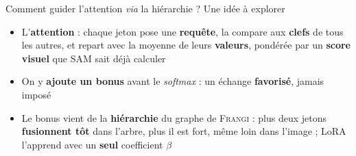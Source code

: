 \begin{frame}[t]{Comment guider l'attention \emph{via} la hiérarchie ? Une idée à explorer}
    \vspace{0.02cm}
    \begin{center}
        \resizebox{0.64\textwidth}{!}{}
    \end{center}

    \vspace{0.06cm}
    \small
    \begin{itemize}
        \setlength{\itemsep}{3pt}
        \item L'\textbf{attention} : chaque jeton pose une \textbf{requête}, la compare aux
        \textbf{clefs} de tous les autres, et repart avec la moyenne de leurs \textbf{valeurs},
        pondérée par un \textbf{score visuel} que SAM sait déjà calculer
        \item On y \textbf{ajoute un bonus} avant le \emph{softmax} : un échange \textbf{favorisé},
        jamais imposé 
        \item Le bonus vient de la \textbf{hiérarchie} du graphe de \textsc{Frangi} : plus deux jetons
        \textbf{fusionnent tôt} dans l'arbre, plus il est fort, même loin dans l'image  ;
        LoRA l'apprend avec un \textbf{seul} coefficient $\beta$ 
    \end{itemize}

    \vspace{0.06cm}
    \begin{center}
    \end{center}
\end{frame}

